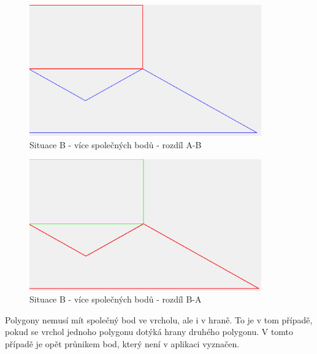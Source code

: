 \documentclass[a4paper,11pt,twoside]{article}
\begin{document}
\vspace{0.2cm}
\begin{figure}[hbt!] 
\begin{center}
\includegraphics[width=10cm]{pictures/B_diffAB.png} 
\caption[Situace B - více společných bodů  - rozdíl A-B]{Situace B - více společných bodů  - rozdíl A-B}
\label{fig:B_diffAB}
\end{center}
\end{figure}

\vspace{0.2cm}
\begin{figure}[hbt!] 
\begin{center}
\includegraphics[width=10cm]{pictures/B_diffBA.png} 
\caption[Situace B - více společných bodů  - rozdíl B-A]{Situace B - více společných bodů  - rozdíl B-A}
\label{fig:B_diffBA}
\end{center}
\end{figure}

Polygony nemusí mít společný bod ve vrcholu, ale i v hraně. To je v tom případě, pokud se vrchol jednoho polygonu dotýká hrany druhého polygonu. V tomto případě je opět průnikem bod, který není v aplikaci vyznačen. 
\end{document}
